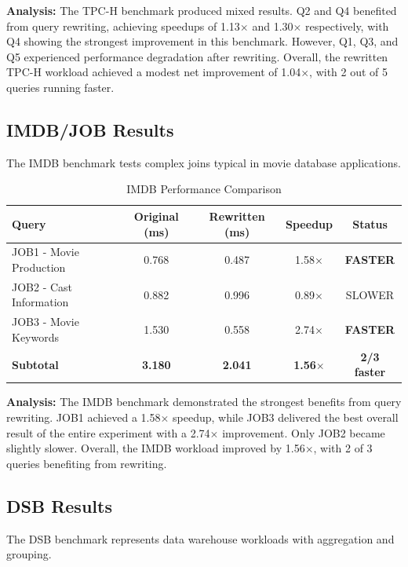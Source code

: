 \documentclass[12pt,a4paper]{article}
\begin{document}
\textbf{Analysis:} The TPC-H benchmark produced mixed results. Q2 and Q4 benefited from query rewriting, achieving speedups of 1.13$\times$ and 1.30$\times$ respectively, with Q4 showing the strongest improvement in this benchmark. However, Q1, Q3, and Q5 experienced performance degradation after rewriting. Overall, the rewritten TPC-H workload achieved a modest net improvement of 1.04$\times$, with 2 out of 5 queries running faster.

\subsection{IMDB/JOB Results}

The IMDB benchmark tests complex joins typical in movie database applications.

\begin{table}[H]
\centering
\caption{IMDB Performance Comparison}
\begin{tabular}{|l|c|c|c|c|}
\hline
\textbf{Query} & \textbf{Original (ms)} & \textbf{Rewritten (ms)} & \textbf{Speedup} & \textbf{Status} \\
\hline
JOB1 - Movie Production & 0.768 & 0.487 & 1.58$\times$ & \textbf{FASTER} \\
JOB2 - Cast Information & 0.882 & 0.996 & 0.89$\times$ & SLOWER \\
JOB3 - Movie Keywords & 1.530 & 0.558 & 2.74$\times$ & \textbf{FASTER} \\
\hline
\textbf{Subtotal} & \textbf{3.180} & \textbf{2.041} & \textbf{1.56$\times$} & \textbf{2/3 faster} \\
\hline
\end{tabular}
\end{table}

\textbf{Analysis:} The IMDB benchmark demonstrated the strongest benefits from query rewriting. JOB1 achieved a 1.58$\times$ speedup, while JOB3 delivered the best overall result of the entire experiment with a 2.74$\times$ improvement. Only JOB2 became slightly slower. Overall, the IMDB workload improved by 1.56$\times$, with 2 of 3 queries benefiting from rewriting.

\subsection{DSB Results}

The DSB benchmark represents data warehouse workloads with aggregation and grouping.
\end{document}
